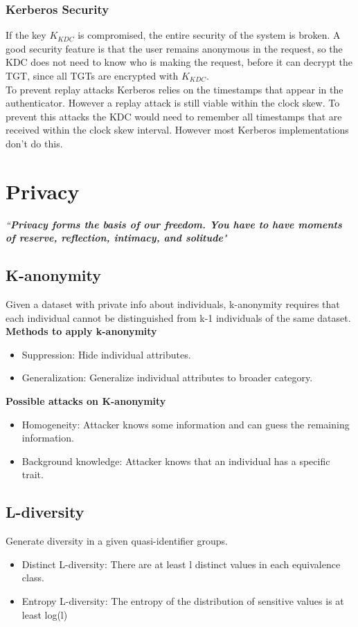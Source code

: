 \documentclass{article}
\begin{document}
\subsubsection{Kerberos Security}
If the key $K_{KDC}$ is compromised, the entire security of the system is broken. A good security feature is that the user remains anonymous in the request, so the KDC does not need to know who is making the request, before it can decrypt the TGT, since all TGTs are encrypted with $K_{KDC}$.\\
To prevent replay attacks Kerberos relies on the timestamps that appear in the authenticator. However a replay attack is still viable within the clock skew. To prevent this attacks the KDC would need to remember all timestamps that are received within the clock skew interval. However most Kerberos implementations don't do this.

\newpage
\section{Privacy}
\textit{“\textbf{Privacy forms the basis of our freedom. You have to have moments of reserve, reflection, intimacy, and solitude}"}

\subsection{K-anonymity}
Given a dataset with private info about individuals, k-anonymity requires that each individual cannot be distinguished from k-1 individuals of the same dataset.\\
\textbf{Methods to apply k-anonymity}
\begin{itemize}
    \item Suppression: Hide individual attributes.
    \item Generalization: Generalize individual attributes to broader category.
\end{itemize}{}
\textbf{Possible attacks on K-anonymity}
\begin{itemize}
    \item Homogeneity: Attacker knows some information and can guess the remaining information.
    \item Background knowledge: Attacker knows that an individual has a specific trait.
\end{itemize}{}

\subsection{L-diversity}
Generate diversity in a given quasi-identifier groups.
\begin{itemize}
    \item Distinct L-diversity: There are at least l distinct values in each equivalence class.
    \item Entropy L-diversity: The entropy of the distribution of sensitive values is at least log(l)
\end{itemize}
\end{document}
